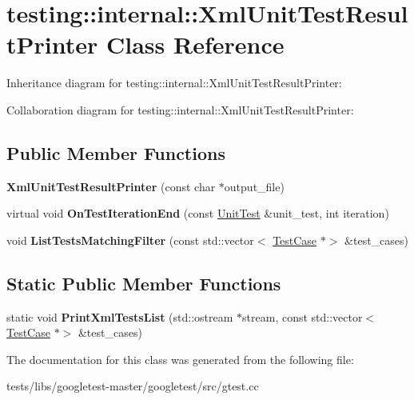 \hypertarget{classtesting_1_1internal_1_1XmlUnitTestResultPrinter}{}\section{testing\+:\+:internal\+:\+:Xml\+Unit\+Test\+Result\+Printer Class Reference}
\label{classtesting_1_1internal_1_1XmlUnitTestResultPrinter}


Inheritance diagram for testing\+:\+:internal\+:\+:Xml\+Unit\+Test\+Result\+Printer\+:


Collaboration diagram for testing\+:\+:internal\+:\+:Xml\+Unit\+Test\+Result\+Printer\+:
\subsection*{Public Member Functions}
\begin{DoxyCompactItemize}
\item 
\mbox{\label{classtesting_1_1internal_1_1XmlUnitTestResultPrinter_afdaf88e6764c18ce0dcc3733d7a06e31}} 
{\bfseries Xml\+Unit\+Test\+Result\+Printer} (const char $\ast$output\+\_\+file)
\item 
\mbox{\label{classtesting_1_1internal_1_1XmlUnitTestResultPrinter_a2ae986dd2f4f2aed31cc6f3bc8c56898}} 
virtual void {\bfseries On\+Test\+Iteration\+End} (const \hyperlink{classtesting_1_1UnitTest}{Unit\+Test} \&unit\+\_\+test, int iteration)
\item 
\mbox{\label{classtesting_1_1internal_1_1XmlUnitTestResultPrinter_a0f0e0bd707d7aed5c008346d7fa95125}} 
void {\bfseries List\+Tests\+Matching\+Filter} (const std\+::vector$<$ \hyperlink{classtesting_1_1TestCase}{Test\+Case} $\ast$$>$ \&test\+\_\+cases)
\end{DoxyCompactItemize}
\subsection*{Static Public Member Functions}
\begin{DoxyCompactItemize}
\item 
\mbox{\label{classtesting_1_1internal_1_1XmlUnitTestResultPrinter_ad202babf81b4b6d6d2f98df1e27a2d50}} 
static void {\bfseries Print\+Xml\+Tests\+List} (std\+::ostream $\ast$stream, const std\+::vector$<$ \hyperlink{classtesting_1_1TestCase}{Test\+Case} $\ast$$>$ \&test\+\_\+cases)
\end{DoxyCompactItemize}


The documentation for this class was generated from the following file\+:\begin{DoxyCompactItemize}
\item 
tests/libs/googletest-\/master/googletest/src/gtest.\+cc\end{DoxyCompactItemize}
